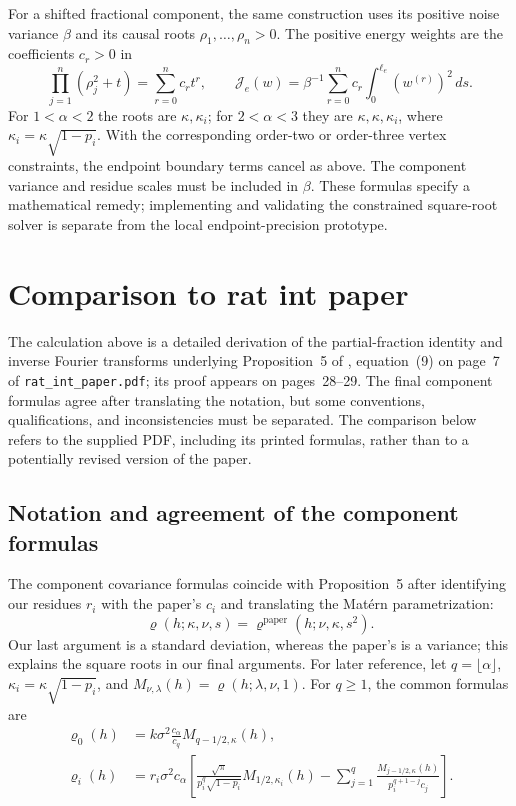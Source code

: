 \documentclass[11pt,a4paper]{article}
\theoremstyle{plain}
\theoremstyle{definition}
\begin{document}
For a shifted fractional component, the same construction uses its
positive noise variance $\beta$ and its causal roots
$\rho_1,\ldots,\rho_n>0$. The positive energy weights are the
coefficients $c_r>0$ in
\begin{equation}
\prod_{j=1}^n(\rho_j^2+t)=\sum_{r=0}^n c_rt^r,
\qquad
\mathcal J_e(w)=\beta^{-1}\sum_{r=0}^n c_r
 \int_0^{\ell_e}(w^{(r)})^2\,ds.
\end{equation}
For $1<\alpha<2$ the roots are $\kappa,\kappa_i$; for
$2<\alpha<3$ they are $\kappa,\kappa,\kappa_i$, where
$\kappa_i=\kappa\sqrt{1-p_i}$.
With the corresponding order-two or order-three vertex constraints,
the endpoint boundary terms cancel as above. The component variance
and residue scales must be included in $\beta$.
These formulas specify a mathematical remedy; implementing and
validating the constrained square-root solver is separate from the
local endpoint-precision prototype.

\section{Comparison to rat int paper}

The calculation above is a detailed derivation of the partial-fraction
identity and inverse Fourier transforms underlying Proposition~5 of
\cite{Bolin2025Linear}, equation~(9) on page~7 of
\texttt{rat\_int\_paper.pdf}; its proof appears on pages~28--29.
The final component formulas agree after translating the notation, but
some conventions, qualifications, and inconsistencies must be separated.
The comparison below refers to the supplied PDF, including its printed
formulas, rather than to a potentially revised version of the paper.

\subsection{Notation and agreement of the component formulas}

The component covariance formulas coincide with Proposition~5 after
identifying our residues $r_i$ with the paper's $c_i$ and translating
the Mat\'ern parametrization:
\begin{equation}
\varrho(h;\kappa,\nu,s)
=\varrho^{\mathrm{paper}}(h;\nu,\kappa,s^2).
\end{equation}
Our last argument is a standard deviation, whereas the paper's is a
variance; this explains the square roots in our final arguments.
For later reference, let $q=\lfloor\alpha\rfloor$,
$\kappa_i=\kappa\sqrt{1-p_i}$, and
$M_{\nu,\lambda}(h)=\varrho(h;\lambda,\nu,1)$. For $q\geq1$, the
common formulas are
\begin{align}
\varrho_0(h)
&=k\sigma^2\frac{c_\alpha}{c_q}M_{q-1/2,\kappa}(h),
\label{eq:comparison_rho0}\\
\varrho_i(h)
&=r_i\sigma^2c_\alpha\left[
 \frac{\sqrt{\pi}}{p_i^q\sqrt{1-p_i}}M_{1/2,\kappa_i}(h)
 -\sum_{j=1}^q\frac{M_{j-1/2,\kappa}(h)}{p_i^{q+1-j}c_j}
 \right].
\label{eq:comparison_rhoi}
\end{align}
\end{document}
